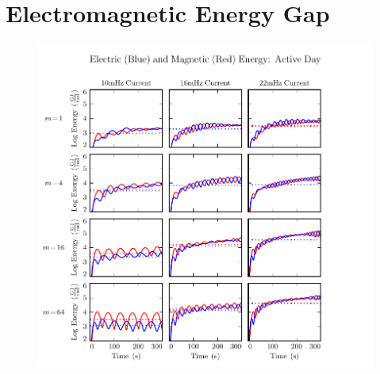 \section{Electromagnetic Energy Gap}


\begin{figure}[H]
    \centering
    \includegraphics[width=\textwidth]{figures/UB_UE_J_1.pdf}
    \caption[Current-Driven Electric and Magnetic Energy: Active Day]{}
    \label{fig_UB_UE_J_1}
\end{figure}

